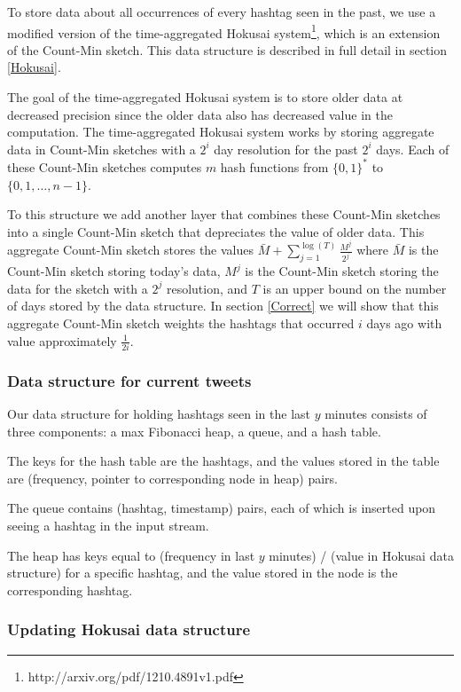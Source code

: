 \documentclass[a4paper,12pt]{article}
\begin{document}
To store data about all occurrences of every hashtag seen in the past, we use a modified version of the time-aggregated Hokusai system\footnote{http://arxiv.org/pdf/1210.4891v1.pdf}, which is an extension of the Count-Min sketch.  This data structure is described in full detail in section \ref{Hokusai}.

The goal of the time-aggregated Hokusai system is to store older data at decreased precision since the older data also has decreased value in the computation.  The time-aggregated Hokusai system works by storing aggregate data in Count-Min sketches with a $2^i$ day resolution for the past $2^i$ days.  Each of these Count-Min sketches computes $m$ hash functions from $\{0,1\}^*$ to $\{0, 1, …, n-1\}$.

To this structure we add another layer that combines these Count-Min sketches into a single Count-Min sketch that depreciates the value of older data.  This aggregate Count-Min sketch stores the values $\bar{M} + \sum\limits_{j=1}^{\log⁡(T)} \frac{M^j}{2^j}$ where $\bar{M}$ is the Count-Min sketch storing today's data, $M^j$ is the Count-Min sketch storing the data for the sketch with a $2^j$ resolution, and $T$ is an upper bound on the number of days stored by the data structure.  In section \ref{Correct} we will show that this aggregate Count-Min sketch weights the hashtags that occurred $i$ days ago with value approximately $\frac{1}{2i}$.

\subsubsection{Data structure for current tweets}

Our data structure for holding hashtags seen in the last $y$ minutes consists of three components: a max Fibonacci heap, a queue, and a hash table.

The keys for the hash table are the hashtags, and the values stored in the table are (frequency, pointer to corresponding node in heap) pairs.

The queue contains (hashtag, timestamp) pairs, each of which is inserted upon seeing a hashtag in the input stream.

The heap has keys equal to (frequency in last $y$ minutes) / (value in Hokusai data structure) for a specific hashtag, and the value stored in the node is the corresponding hashtag.

\subsubsection{Updating Hokusai data structure\label{Hokusai}}
\end{document}
